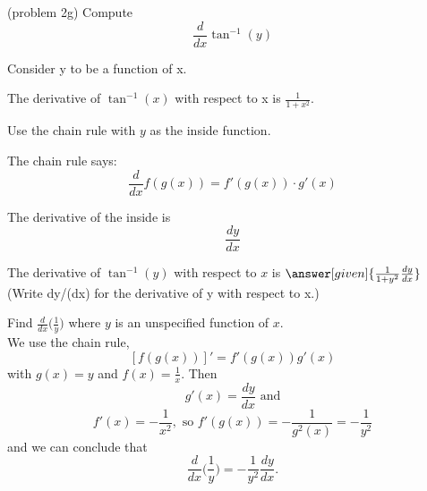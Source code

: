 \documentclass{ximera}
\begin{document}
\begin{problem}(problem 2g)
  Compute
  \[
  \frac{d}{dx} \tan^{-1}(y)
  \]
  
	  
    \begin{hint}
      Consider y to be a function of x.
    \end{hint}
		\begin{hint}
     The derivative of $\tan^{-1}(x)$ with respect to x is $\frac{1}{1+x^2}$.
    \end{hint}
    \begin{hint}
      Use the chain rule with $y$ as the inside function.
    \end{hint}
    \begin{hint}
      The chain rule says:
      \[
      \frac{d}{dx} f(g(x)) = f'(g(x))\cdot g'(x)
      \]
    \end{hint}
    \begin{hint}
      The derivative of the inside is 
      \[
      \frac{dy}{dx}
      \]
    \end{hint}
    
		The derivative of $\tan^{-1}(y)$ with respect to $x$ is
		 $\answer[given]{\frac{1}{1+y^2} \frac{dy}{dx}}$  (Write dy/(dx) for the derivative of y with respect to x.)
		
\end{problem}



\begin{example}[example 3]
Find $\frac{d}{dx} \big(\frac{1}{y}\big)$ where $y$ is an unspecified function of $x$.\\
We use the chain rule,
\[\displaystyle{[f(g(x))]' = f'(g(x))g'(x)}\]
with $g(x) = y$ and $f(x) = \frac{1}{x}$. Then 
\[g'(x) = \frac{dy}{dx} \text{ and}\]
\[f'(x) = -\frac{1}{x^2}, \text{ so } f'(g(x)) = -\frac{1}{g^2(x)} = -\frac{1}{y^2}\]
and we can conclude that
\[\frac{d}{dx} \Big(\frac{1}{y}\Big) = -\frac{1}{y^2} \frac{dy}{dx}.\]
\end{example}


\begin{center}
\begin{foldable}
\end{foldable}
\end{center}
\end{document}
